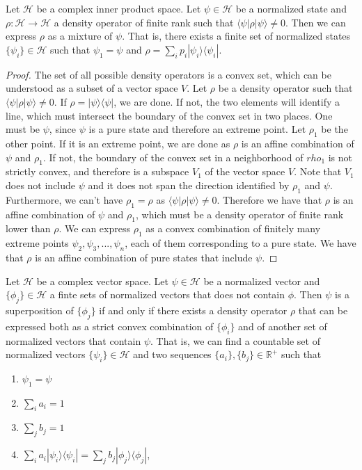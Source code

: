 \documentclass[10pt,twocolumn, nofootinbib]{revtex4-2}
\def\>{\rangle}
\def\<{\langle}
\begin{document}
\begin{prop}\label{prop_decomposition}
	Let $\mathcal{H}$ be a complex inner product space. Let $\psi \in \mathcal{H}$ be a normalized state and $\rho : \mathcal{H} \to \mathcal{H}$ a density operator of finite rank such that $\<\psi|\rho|\psi\>\neq 0$. Then we can express $\rho$ as a mixture of $\psi$. That is, there exists a finite set of normalized states $\{\psi_i\} \in \mathcal{H}$ such that $\psi_1 = \psi$ and $\rho = \sum_i p_i |\psi_i\>\<\psi_i|$.
\end{prop}

\begin{proof}
	The set of all possible density operators is a convex set, which can be understood as a subset of a vector space $V$. Let $\rho$ be a density operator such that $\<\psi|\rho|\psi\>\neq 0$. If $\rho = |\psi\>\<\psi|$, we are done. If not, the two elements will identify a line, which must intersect the boundary of the convex set in two places. One must be $\psi$, since $\psi$ is a pure state and therefore an extreme point. Let $\rho_1$ be the other point. If it is an extreme point, we are done as $\rho$ is an affine combination of $\psi$ and $\rho_1$. If not, the boundary of the convex set in a neighborhood of $rho_1$ is not strictly convex, and therefore is a subspace $V_1$ of the vector space $V$. Note that $V_1$ does not include $\psi$ and it does not span the direction identified by $\rho_1$ and $\psi$. Furthermore, we can't have $\rho_1 = \rho$ as $\<\psi|\rho|\psi\>\neq 0$. Therefore we have that $\rho$ is an affine combination of $\psi$ and $\rho_1$, which must be a density operator of finite rank lower than $\rho$. We can express $\rho_1$ as a convex combination of finitely many extreme points $\psi_2, \psi_3, ..., \psi_n$, each of them corresponding to a pure state. We have that $\rho$ is an affine combination of pure states that include $\psi$.
\end{proof}

\begin{prop}
Let $\mathcal{H}$ be a complex vector space. Let $\psi \in \mathcal{H}$ be a normalized vector and $\{\phi_j\} \in \mathcal{H}$ a finte sets of normalized vectors that does not contain $\phi$. Then $\psi$ is a superposition of $\{\phi_j\}$ if and only if there exists a density operator $\rho$ that can be expressed both as a strict convex combination of $\{\phi_i\}$ and of another set of normalized vectors that contain $\psi$. That is, we can find a countable set of normalized vectors $\{\psi_i\} \in \mathcal{H}$ and two sequences $\{a_i\}, \{b_j\} \in \mathbb{R}^+$ such that
\begin{enumerate}
	\item $\psi_1 = \psi$
	\item $\sum_i a_i = 1$
	\item $\sum_j b_j = 1$
	\item $\sum_i a_i |\psi_i\>\<\psi_i| = \sum_j b_j |\phi_j\>\<\phi_j|$,
\end{enumerate}
\end{prop}
\end{document}
